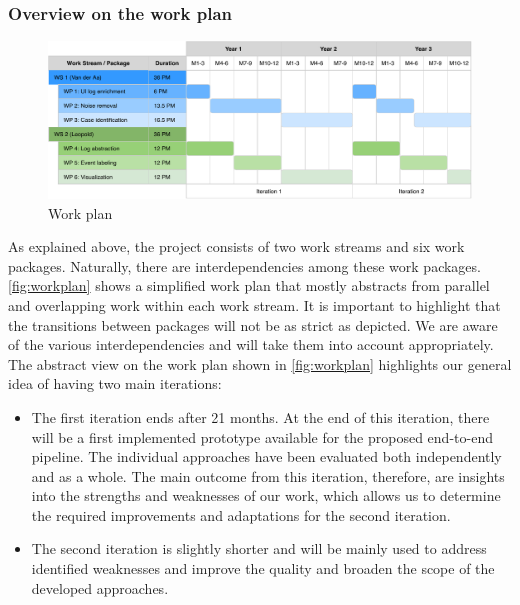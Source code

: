 \subsubsection{Overview on the work plan}

\begin{figure}[bt]
\centering
	\includegraphics[width=\textwidth]{Figures/Gantt.pdf}
	\caption{Work plan}
	\label{fig:workplan}
\end{figure}

As explained above, the project consists of two work streams and six work packages. Naturally, there are interdependencies among these work packages. \autoref{fig:workplan} shows a simplified work plan that mostly abstracts from parallel and overlapping work within each work stream. It is important to highlight that the transitions between packages will not be as strict as depicted. We are aware of the various interdependencies and will take them into account appropriately.  
The abstract view on the work plan shown in \autoref{fig:workplan} highlights our general idea of having two main iterations:
\begin{itemize}
	\item The first iteration ends after 21 months. At the end of this iteration, there will be a first implemented prototype available for the proposed end-to-end pipeline. The individual approaches have been evaluated both independently and as a whole. The main outcome from this iteration, therefore, are insights into the strengths and weaknesses of our work, which allows us to determine the required improvements and adaptations for the second iteration. 
	\item The second iteration is slightly shorter and will be mainly used to address identified weaknesses and improve the quality and broaden the scope of the developed approaches.
\end{itemize} 

